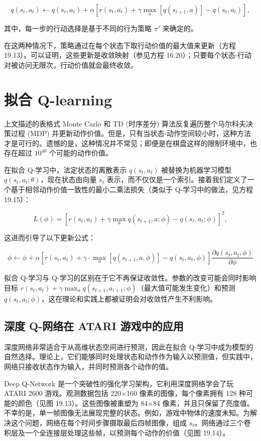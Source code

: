 \[
q(s_t, a_t) \leftarrow q(s_t, a_t) + \alpha \left[ r(s_t, a_t) + \gamma \max_{a} [q(s_{t+1}, a)] - q(s_t, a_t) \right], \tag{19.15}
\]

其中，每一步的行动选择是基于不同的行为策略 \(\pi'\) 来确定的。

在这两种情况下，策略通过在每个状态下取行动价值的最大值来更新（方程 19.13）。可以证明，这些更新是收敛映射（参见方程 16.20）；只要每个状态-行动对被访问无限次，行动价值就会最终收敛。

\section{拟合 Q-learning}
上文描述的表格式 Monte Carlo 和 TD (时序差分) 算法反复遍历整个马尔科夫决策过程 (MDP) 并更新动作价值。但是，只有当状态-动作空间较小时，这种方法才是可行的。遗憾的是，这种情况并不常见；即便是在棋盘这样的限制环境中，也存在超过 \(10^{40}\) 个可能的动作价值。

在拟合 Q-学习中，法定状态的离散表示 \(q(s_t, a_t)\) 被替换为机器学习模型 \(q(s_t, a_t; \theta)\)，现在状态由向量 \(s_t\) 表示，而不仅仅是一个索引。接着我们定义了一个基于相邻动作价值一致性的最小二乘法损失（类似于 Q-学习中的做法，见方程 19.15）：

\[
L(\phi) = \left[ r(s_t, a_t) + \gamma \max_{a} q(s_{t+1}, a; \phi) - q(s_t, a_t; \phi) \right]^2, \tag{19.16}
\]

这进而引导了以下更新公式：

\[
\phi \leftarrow \phi + \alpha \left[ r(s_t, a_t) + \gamma \cdot \max_a [q(s_{t+1}, a, \phi)] - q(s_t, a_t, \phi) \right] \frac{\partial q(s_t, a_t, \phi)}{\partial \phi} \tag{19.17}
\]

拟合 Q-学习与 Q-学习的区别在于它不再保证收敛性。参数的改变可能会同时影响目标 \(r(s_t, a_t) + \gamma \max_{a} q(s_{t+1}, a_{t+1}; \phi)\)（最大值可能发生变化）和预测 \(q(s_t, a_t; \phi)\)，这在理论和实践上都被证明会对收敛性产生不利影响。

\subsection{深度 Q-网络在 ATARI 游戏中的应用}
深度网络非常适合于从高维状态空间进行预测，因此在拟合 Q-学习中成为模型的自然选择。理论上，它们能够同时处理状态和动作作为输入以预测值，但实践中，网络只接收状态作为输入，并同时预测各个动作的值。

Deep Q-Network 是一个突破性的强化学习架构，它利用深度网络学会了玩 ATARI 2600 游戏。观测数据包括 220×160 像素的图像，每个像素拥有 128 种可能的颜色（见图 19.13）。这些图像被重塑为 84×84 像素，并且只保留了亮度值。不幸的是，单一帧图像无法展现完整的状态。例如，游戏中物体的速度未知。为解决这个问题，网络在每个时间步骤摄取最后四帧图像，组成 \(s_t\)。网络通过三个卷积层及一个全连接层处理这些帧，以预测每个动作的价值（见图 19.14）。

